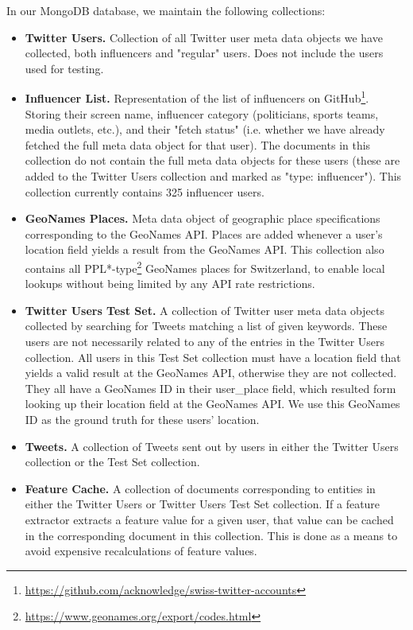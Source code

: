 \documentclass[10pt,a4paper]{article}
\begin{document}
In our MongoDB database, we maintain the following collections:
\begin{itemize}
\item \textbf{Twitter Users.} Collection of all Twitter user meta data objects we have collected, both influencers and "regular" users. Does not include the users used for testing.
\item \textbf{Influencer List.} Representation of the list of influencers on GitHub\footnote{\href{https://github.com/acknowledge/swiss-twitter-accounts}{https://github.com/acknowledge/swiss-twitter-accounts}}. Storing their screen name, influencer category (politicians, sports teams, media outlets, etc.), and their "fetch status" (i.e. whether we have already fetched the full meta data object for that user). The documents in this collection do not contain the full meta data objects for these users (these are added to the Twitter Users collection and marked as "type: influencer"). This collection currently contains 325 influencer users.
\item \textbf{GeoNames Places.} Meta data object of geographic place specifications corresponding to the GeoNames API. Places are added whenever a user's location field yields a result from the GeoNames API. This collection also contains all PPL*-type\footnote{\href{https://www.geonames.org/export/codes.html}{https://www.geonames.org/export/codes.html}}  GeoNames places for Switzerland, to enable local lookups without being limited by any API rate restrictions.
\item \textbf{Twitter Users Test Set.} A collection of Twitter user meta data objects collected by searching for Tweets matching a list of given keywords. These users are not necessarily related to any of the entries in the Twitter Users collection. All users in this Test Set collection must have a location field that yields a valid result at the GeoNames API, otherwise they are not collected. They all have a GeoNames ID in their user\_place field, which resulted form looking up their location field at the GeoNames API. We use this GeoNames ID as the ground truth for these users' location.
\item \textbf{Tweets.} A collection of Tweets sent out by users in either the Twitter Users collection or the Test Set collection. 
\item \textbf{Feature Cache.} A collection of documents corresponding to entities in either the Twitter Users or Twitter Users Test Set collection. If a feature extractor extracts a feature value for a given user, that value can be cached in the corresponding document in this collection. This is done as a means to avoid expensive recalculations of feature values.
\end{itemize}
\end{document}
